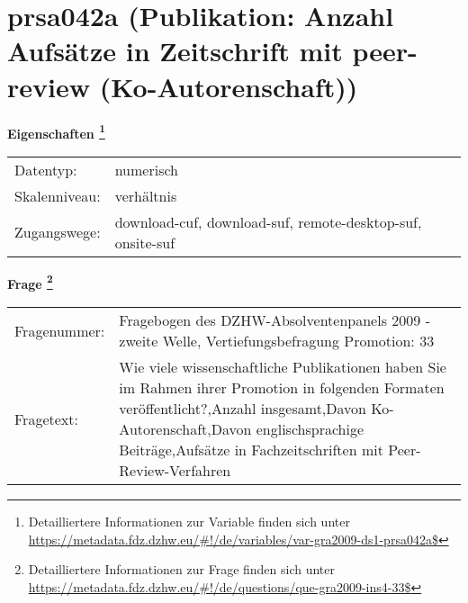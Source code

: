 
    \setcounter{footnote}{0}

    \vspace*{-1.8cm}
	\section{prsa042a (Publikation: Anzahl Aufsätze in Zeitschrift mit peer-review (Ko-Autorenschaft))}
	\label{section:prsa042a}



    \vspace*{0.5cm}
    \noindent\textbf{Eigenschaften
	\footnote{Detailliertere Informationen zur Variable finden sich unter
		\url{https://metadata.fdz.dzhw.eu/\#!/de/variables/var-gra2009-ds1-prsa042a$}}}\\
	\begin{tabularx}{\hsize}{@{}lX}
	Datentyp: & numerisch \\
	Skalenniveau: & verhältnis \\
	Zugangswege: &
	  download-cuf, 
	  download-suf, 
	  remote-desktop-suf, 
	  onsite-suf
 \\
    \end{tabularx}



				\vspace*{0.5cm}
                \noindent\textbf{Frage
	                \footnote{Detailliertere Informationen zur Frage finden sich unter
		              \url{https://metadata.fdz.dzhw.eu/\#!/de/questions/que-gra2009-ins4-33$}}}\\
				\begin{tabularx}{\hsize}{@{}lX}
					Fragenummer: &
					  Fragebogen des DZHW-Absolventenpanels 2009 - zweite Welle, Vertiefungsbefragung Promotion:
					  33
 \\
					Fragetext: & Wie viele wissenschaftliche Publikationen haben Sie im Rahmen ihrer Promotion in folgenden Formaten veröffentlicht?,Anzahl insgesamt,Davon Ko-Autorenschaft,Davon englischsprachige Beiträge,Aufsätze in Fachzeitschriften mit Peer-Review-Verfahren \\
				\end{tabularx}





